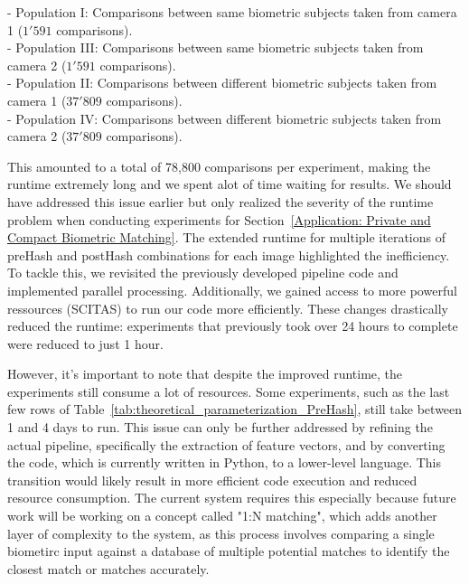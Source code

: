 - Population I: Comparisons between same biometric subjects taken from camera 1 (\(1'591\) comparisons).\\
- Population III: Comparisons between same biometric subjects taken from camera 2 (\(1'591\) comparisons).\\
- Population II: Comparisons between different biometric subjects taken from camera 1 (\(37'809\) comparisons).\\
- Population IV: Comparisons between different biometric subjects taken from camera 2 (\(37'809\) comparisons).

This amounted to a total of 78,800 comparisons per experiment, making the runtime extremely long and we spent alot of time waiting for results. We should have addressed this issue earlier but only realized the severity of the runtime problem when conducting experiments for Section~\ref{Application: Private and Compact Biometric Matching}. The extended runtime for multiple iterations of preHash and postHash combinations for each image highlighted the inefficiency. To tackle this, we revisited the previously developed pipeline code and implemented parallel processing. Additionally, we gained access to more powerful ressources (SCITAS\cite{ref4}) to run our code more efficiently. These changes drastically reduced the runtime: experiments that previously took over 24 hours to complete were reduced to just 1 hour.

However, it's important to note that despite the improved runtime, the experiments still consume a lot of resources. Some experiments, such as the last few rows of Table~\ref{tab:theoretical_parameterization_PreHash}, still take between 1 and 4 days to run. This issue can only be further addressed by refining the actual pipeline, specifically the extraction of feature vectors, and by converting the code, which is currently written in Python, to a lower-level language. This transition would likely result in more efficient code execution and reduced resource consumption. The current system requires this especially because future work will be working on a concept called "1:N matching", which adds another layer of complexity to the system, as this process involves comparing a single biometirc input against a database of multiple potential matches to identify the closest match or matches accurately.